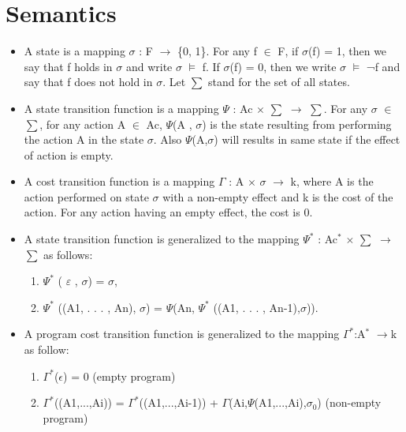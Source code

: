 \documentclass[11pt]{article}
\begin{document}
	\section{Semantics}
	\begin{itemize}
\item 	A state is a mapping $\sigma$ : F $\rightarrow$ \{0, 1\}. For any f $\in$ F, if $\sigma$(f) = 1, then we say that f holds in $\sigma$ and write $\sigma$   $\vDash$   f. If $\sigma$(f) = 0, then we write $\sigma$   $\vDash$   ¬f and say that f does not hold in $\sigma$. Let $\sum$ stand for the set of all states.

\item 	A state transition function is a mapping $\Psi$ : Ac $\times$ $\sum$ $\rightarrow$ $\sum$. For any $\sigma$ $\in$ $\sum$, for any action A $\in$ Ac, $\Psi$(A , $\sigma$) is the state resulting from performing the action A in the state $\sigma$. Also $\Psi$(A,$\sigma$) will results in same state if the effect of action is empty.

\item A cost transition function is a mapping $\Gamma$ : A $\times$ $\sigma$ $\rightarrow$ k, where A is the action performed on state $\sigma$ with a non-empty effect and k is the cost of the action. For any action having an empty effect, the cost is 0.

\item 	A state transition function is generalized to the mapping $\Psi^{\ast}$ : Ac$^{\ast}$  $\times$  $\sum$ $\rightarrow$ $\sum$ as follows: 
\begin{enumerate}

\item $\Psi^{\ast}$ ( $\varepsilon$ , $\sigma$) = $\sigma$,
 
\item $\Psi^{\ast}$ ((A1, . . . , An), $\sigma$) = $\Psi$(An, $\Psi^{\ast}$ ((A1, . . . , An-1),$\sigma$)).

\end{enumerate}

\item A program cost transition function is generalized to the mapping $\Gamma^{\ast}$:A$^{\ast}$ $\rightarrow$k as follow:
\begin{enumerate}
\item $\Gamma^{\ast}$($\epsilon$) = 0 (empty program)
\item $\Gamma^{\ast}$((A1,...,Ai)) = $\Gamma^{\ast}$((A1,...,Ai-1)) + $\Gamma$(Ai,$\Psi$(A1,...,Ai),$\sigma_{0}$) (non-empty program)
\end{enumerate}


\end{itemize}
\end{document}
